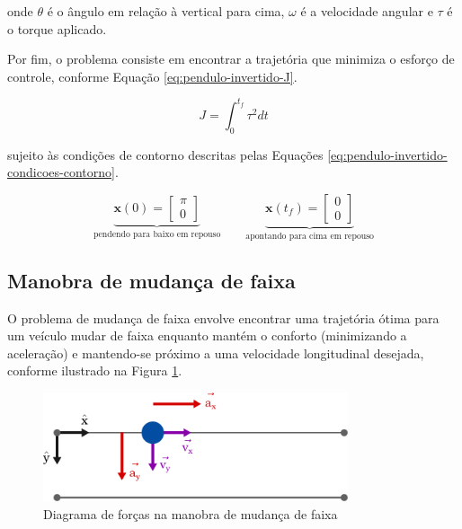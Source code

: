 \noindent onde $\theta$ é o ângulo em relação à vertical para cima, $\omega$ é a velocidade angular e $\tau$ é o torque aplicado.

Por fim, o problema consiste em encontrar a trajetória que minimiza o esforço de controle, conforme Equação \ref{eq:pendulo-invertido-J}.

\begin{equation}
    J = \int_0^{t_f} \tau^2 dt
    \label{eq:pendulo-invertido-J}
\end{equation}

\noindent sujeito às condições de contorno descritas pelas Equações \ref{eq:pendulo-invertido-condicoes-contorno}.

\begin{equation}
    \underbrace{\mathbf{x}(0) = \begin{bmatrix} \pi \\ 0 \end{bmatrix}}_{\text{pendendo para baixo em repouso}}
    \qquad
    \underbrace{\mathbf{x}(t_f) = \begin{bmatrix} 0 \\ 0 \end{bmatrix}}_{\text{apontando para cima em repouso}}
    \label{eq:pendulo-invertido-condicoes-contorno}
\end{equation}


\subsection{Manobra de mudança de faixa}
\label{subsec:manobra-mudanca-faixa}

O problema de mudança de faixa envolve encontrar uma trajetória ótima para um veículo mudar de faixa enquanto mantém o conforto (minimizando a aceleração) e mantendo-se próximo a uma velocidade longitudinal desejada, conforme ilustrado na Figura \ref{fig:manobra-mudanca-faixa}.

\begin{figure}[H]
    \centering
    \includegraphics[width=0.8\textwidth]{Cap3/figuras/manobra-mudanca-faixa.pdf}
    \caption{Diagrama de forças na manobra de mudança de faixa}
    \label{fig:manobra-mudanca-faixa}
\end{figure}

